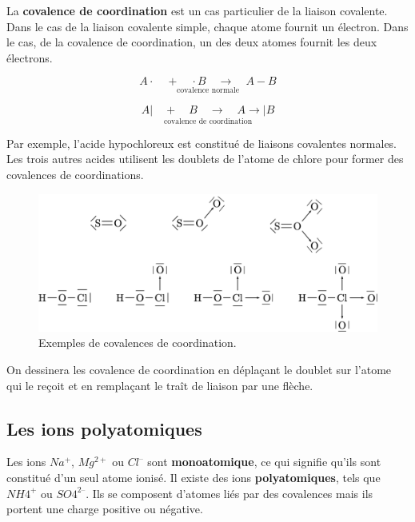 \documentclass[
  11pt,
  a4paper,
  openany]{book}
\begin{document}
La \textbf{covalence de coordination} est un cas particulier de la liaison covalente. Dans le cas de la liaison covalente simple, chaque atome fournit un électron. Dans le cas, de la covalence de coordination, un des deux atomes fournit les deux électrons.

\[ \underset{\text{covalence normale}}{A \cdot \quad + \quad \cdot B \quad \longrightarrow \quad A - B} \]

\[ \underset{\text{covalence de coordination}}{A | \quad + \quad B \quad \longrightarrow \quad A \rightarrow | B} \]

Par exemple, l'acide hypochloreux est constitué de liaisons covalentes normales. Les trois autres acides utilisent les doublets de l'atome de chlore pour former des covalences de coordinations.

\begin{figure}

{\centering \includegraphics[width=0.85\linewidth]{images/covalences-coordination} 

}

\caption{Exemples de covalences de coordination.}\label{fig:covalences-coordination}
\end{figure}

On dessinera les covalence de coordination en déplaçant le doublet sur l'atome qui le reçoit et en remplaçant le traît de liaison par une flèche.

\hypertarget{les-ions-polyatomiques}{%
\subsection{Les ions polyatomiques}\label{les-ions-polyatomiques}}

Les ions \(Na^+\), \(Mg^{2+}\) ou \(Cl^–\) sont \textbf{monoatomique}, ce qui signifie qu'ils sont constitué d'un seul atome ionisé. Il existe des ions \textbf{polyatomiques}, tels que \(NH4^+\) ou \(SO4^{2–}\). Ils se composent d'atomes liés par des covalences mais ils portent une charge positive ou négative.
\end{document}
